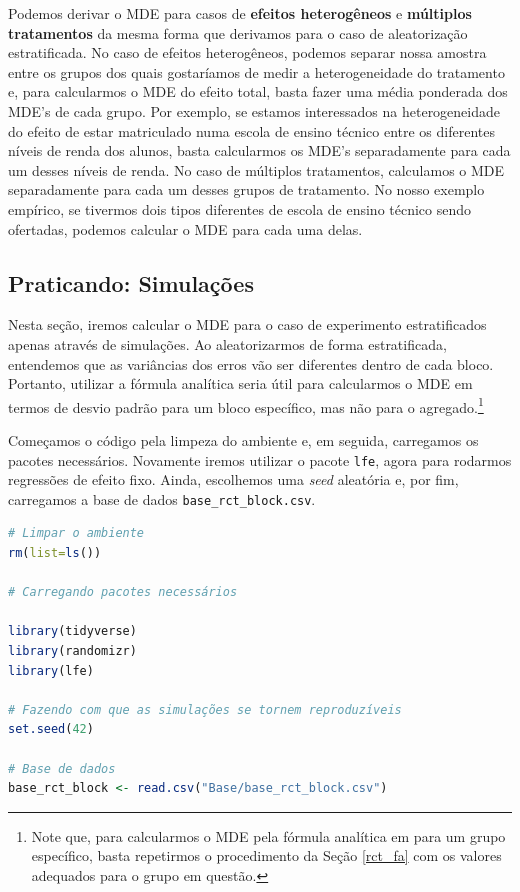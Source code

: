 Podemos derivar o MDE para casos de \textbf{efeitos heterogêneos} e \textbf{múltiplos tratamentos} da mesma forma que derivamos para o caso de aleatorização estratificada. No caso de efeitos heterogêneos, podemos separar nossa amostra entre os grupos dos quais gostaríamos de medir a heterogeneidade do tratamento e, para calcularmos o MDE do efeito total, basta fazer uma média ponderada dos MDE's de cada grupo. Por exemplo, se estamos interessados na heterogeneidade do efeito de estar matriculado numa escola de ensino técnico entre os diferentes níveis de renda dos alunos, basta calcularmos os MDE's separadamente para cada um desses níveis de renda. No caso de múltiplos tratamentos, calculamos o MDE separadamente para cada um desses grupos de tratamento. No nosso exemplo empírico, se tivermos dois tipos diferentes de escola de ensino técnico sendo ofertadas, podemos calcular o MDE para cada uma delas. 

\subsection{\sc Praticando: Simulações}

Nesta seção, iremos calcular o MDE para o caso de experimento estratificados apenas através de simulações. Ao aleatorizarmos de forma estratificada, entendemos que as variâncias dos erros vão ser diferentes dentro de cada bloco. Portanto, utilizar a fórmula analítica seria útil para calcularmos o MDE em termos de desvio padrão para um bloco específico, mas não para o agregado.\footnote{Note que, para calcularmos o MDE pela fórmula analítica em para um grupo específico, basta repetirmos o procedimento da Seção \ref{rct_fa} com os valores adequados para o grupo em questão.}

Começamos o código pela limpeza do ambiente e, em seguida, carregamos os pacotes necessários. Novamente iremos utilizar o pacote \texttt{lfe}, agora para rodarmos regressões de efeito fixo. Ainda, escolhemos uma \textit{seed} aleatória e, por fim, carregamos a base de dados \texttt{base\_rct\_block.csv}.

\begin{boxH}
\begin{lstlisting}[language = R]
# Limpar o ambiente 
rm(list=ls())

# Carregando pacotes necessários

library(tidyverse)
library(randomizr)
library(lfe)

# Fazendo com que as simulações se tornem reproduzíveis
set.seed(42)

# Base de dados
base_rct_block <- read.csv("Base/base_rct_block.csv")
\end{lstlisting}
\end{boxH}


